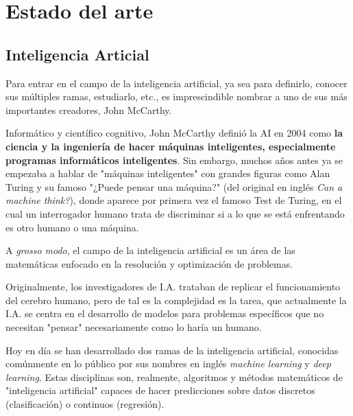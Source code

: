 
\chapter{Estado del arte}

\section{Inteligencia Articial}

Para entrar en el campo de la inteligencia artificial, ya sea para definirlo, conocer sus múltiples ramas, estudiarlo, etc., es imprescindible nombrar a  uno de sus más importantes creadores, John McCarthy. 

Informático y científico cognitivo, John McCarthy definió la AI en 2004 como \textbf{la ciencia y la ingeniería de hacer máquinas inteligentes, especialmente programas informáticos inteligentes}\cite{mccarthy_2004}. Sin embargo, muchos años antes ya se empezaba a hablar de "máquinas inteligentes" con grandes figuras como Alan Turing y su famoso "¿Puede pensar una máquina?" (del original en inglés \textit{Can a machine think?}), donde aparece por primera vez el famoso Test de Turing, en el cual un interrogador humano trata de discriminar si a lo que se está enfrentando es otro humano o una máquina.

A \textit{grosso modo}, el campo de la inteligencia artificial es un área de las matemáticas enfocado en la resolución y optimización de problemas.

Originalmente, los investigadores de I.A. trataban de replicar el funcionamiento del cerebro humano, pero de tal es la complejidad es la tarea, que actualmente la I.A. se centra en el desarrollo de modelos para problemas específicos que no necesitan "pensar" necesariamente como lo haría un humano.

%

Hoy en día se han desarrollado dos ramas de la inteligencia artificial, conocidas comúnmente en lo público por sus nombres en inglés \textit{machine learning} y \textit{deep learning}. Estas disciplinas son, realmente, algoritmos y métodos matemáticos de "inteligencia artificial" capaces de hacer predicciones sobre datos discretos (clasificación) o continuos (regresión). 


